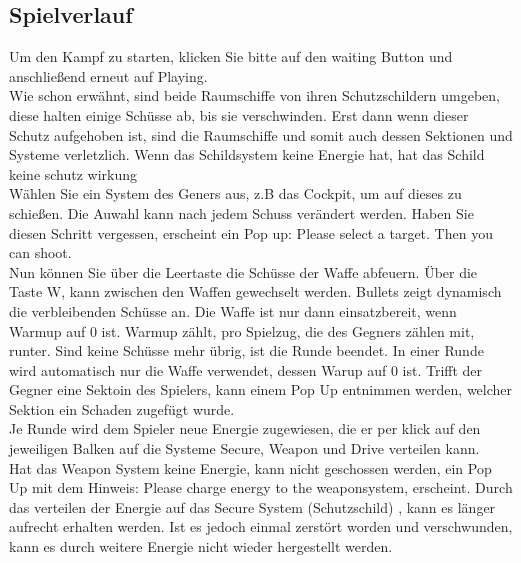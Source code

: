 \documentclass[fontsize=12pt,paper=a4,twoside]{scrartcl}
\begin{document}
\subsection{Spielverlauf}

Um den Kampf zu starten, klicken Sie bitte auf den waiting Button und anschließend erneut
auf Playing.\\

Wie schon erwähnt, sind beide Raumschiffe von ihren Schutzschildern umgeben, diese halten einige 
Schüsse ab, bis sie verschwinden. Erst dann wenn dieser Schutz aufgehoben ist, sind die Raumschiffe und somit auch dessen Sektionen und Systeme verletzlich. Wenn das Schildsystem keine Energie hat, hat das Schild keine schutz wirkung\\

Wählen Sie ein System des Geners aus, z.B das Cockpit, um auf dieses zu schießen. Die Auwahl kann nach jedem Schuss verändert werden. Haben Sie diesen
Schritt vergessen, erscheint ein Pop up: Please select a target. Then you can shoot.\\

Nun können Sie über die Leertaste die Schüsse der Waffe abfeuern. Über die Taste W, kann zwischen den Waffen gewechselt werden. 
Bullets zeigt dynamisch die verbleibenden Schüsse an. Die Waffe ist nur dann einsatzbereit, wenn Warmup auf 0 ist. Warmup zählt, pro Spielzug, die des Gegners zählen mit, runter. Sind keine Schüsse mehr übrig, ist die Runde beendet.
In einer Runde wird automatisch nur die Waffe verwendet, dessen Warup auf 0 ist.
Trifft der Gegner eine Sektoin des Spielers, kann einem Pop Up entnimmen werden, welcher Sektion ein Schaden zugefügt wurde.\\

Je Runde wird dem Spieler neue Energie zugewiesen, die er per klick auf den jeweiligen Balken auf die Systeme Secure, Weapon und Drive
verteilen kann.\\

Hat das Weapon System keine Energie, kann nicht geschossen werden, ein Pop Up mit dem Hinweis:
Please charge energy to the weaponsystem, erscheint.
Durch das verteilen der Energie auf das Secure System (Schutzschild) , kann es länger aufrecht erhalten werden. Ist es jedoch einmal zerstört worden und verschwunden, kann es durch weitere Energie nicht wieder hergestellt werden.\\
\end{document}

